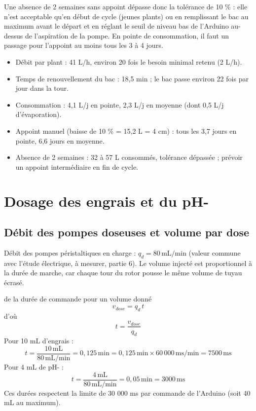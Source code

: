 \documentclass[11pt,a4paper]{article}
\newcommand{\U}[1]{\,\mathrm{#1}}
\begin{document}
Une absence de 2 semaines sans appoint dépasse donc la tolérance de 10 \% : elle n'est acceptable qu'en début de cycle (jeunes plants) ou en remplissant le bac au maximum avant le départ et en réglant le seuil de niveau bas de l'Arduino au-dessus de l'aspiration de la pompe. En pointe de consommation, il faut un passage pour l'appoint au moins tous les 3 à 4 jours.

\begin{resume}
\begin{itemize}
  \item Débit par plant : 41 L/h, environ 20 fois le besoin minimal retenu (2 L/h).
  \item Temps de renouvellement du bac : 18,5 min ; le bac passe environ 22 fois par jour dans la tour.
  \item Consommation : 4,1 L/j en pointe, 2,3 L/j en moyenne (dont 0,5 L/j d'évaporation).
  \item Appoint manuel (baisse de 10 \% = 15,2 L = 4 cm) : tous les 3,7 jours en pointe, 6,6 jours en moyenne.
  \item Absence de 2 semaines : 32 à 57 L consommés, tolérance dépassée ; prévoir un appoint intermédiaire en fin de cycle.
\end{itemize}
\end{resume}

\newpage
\section{Dosage des engrais et du pH-}
\subsection{Débit des pompes doseuses et volume par dose}

\begin{hypo}
Débit des pompes péristaltiques en charge : $q_d = 80\U{mL/min}$ (valeur commune avec l'étude électrique, à mesurer, partie 6). Le volume injecté est proportionnel à la durée de marche, car chaque tour du rotor pousse le même volume de tuyau écrasé.
\end{hypo}

\begin{calcul}{de la durée de commande pour un volume donné}
\[ v_{dose} = q_d\,t \]
d'où
\[ t = \frac{v_{dose}}{q_d} \]
Pour 10 mL d'engrais :
\[ t = \frac{10\U{mL}}{80\U{mL/min}} = 0{,}125\U{min} = 0{,}125\U{min}\times60\,000\U{ms/min} = 7500\U{ms} \]
Pour 4 mL de pH- :
\[ t = \frac{4\U{mL}}{80\U{mL/min}} = 0{,}05\U{min} = 3000\U{ms} \]
Ces durées respectent la limite de 30 000 ms par commande de l'Arduino (soit 40 mL au maximum).
\end{calcul}
\end{document}
